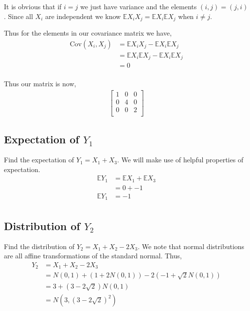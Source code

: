 \documentclass{article}
\newcommand{\expect}{\mathbb{E}}
\begin{document}
It is obvious that if $i = j$ we just have variance and the elements
$(i, j) = (j ,i)$. Since all $X_i$ are independent we know
$\expect X_i X_j = \expect X_i \expect X_j$ when $i \neq j$.

Thus for the elements in our covariance matrix we have,
\begin{align*}
    \text{Cov}(X_i,X_j) & = \expect X_i X_j - \expect X_i \expect X_j \\
    & = \expect X_i \expect X_j - \expect X_i \expect X_j \\
    & = 0 \\
\end{align*}

Thus our matrix is now,
\begin{align*}
    \begin{bmatrix}
        1 & 0 & 0 \\
        0 & 4 & 0 \\
        0 & 0 & 2 \\
    \end{bmatrix}
\end{align*}

\subsection{Expectation of $Y_1$}
Find the expectation of $Y_1 = X_1 + X_3$. We will make use of helpful
properties of expectation.
\begin{align*}
    \expect Y_1 &= \expect X_1 + \expect X_3 \\
    &= 0 + -1 \\
    \expect Y_1 &= -1 \\
\end{align*}

\subsection{Distribution of $Y_2$}
Find the distribution of $Y_2 = X_1 + X_2 - 2X_3$. We note that normal
distributions are all affine transformations of the standard normal. Thus,
\begin{align*}
    Y_2 &= X_1 + X_2 - 2X_3 \\
    &= N(0,1) + (1 + 2 N(0,1)) - 2(-1 + \sqrt{2} N(0,1)) \\
    &= 3 + (3 - 2\sqrt{2}) N(0,1) \\
    &= N(3, (3-2\sqrt{2})^2) \\
\end{align*}
\end{document}
